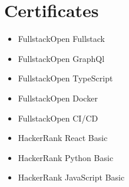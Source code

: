 \section{Certificates}

\begin{itemize}
	\item FullstackOpen Fullstack
	\item FullstackOpen GraphQl
	\item FullstackOpen TypeScript
	\item FullstackOpen Docker
	\item FullstackOpen CI/CD
	\item HackerRank React Basic
	\item HackerRank Python Basic
	\item HackerRank JavaScript Basic
\end{itemize}